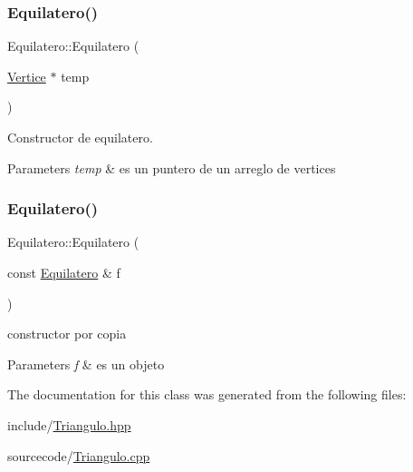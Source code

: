 \subsubsection{\texorpdfstring{Equilatero()}{Equilatero()}\hspace{0.1cm}{\footnotesize\ttfamily [1/2]}}
{\footnotesize\ttfamily Equilatero\+::\+Equilatero (\begin{DoxyParamCaption}\item[{\hyperlink{class_vertice}{Vertice} $\ast$}]{temp }\end{DoxyParamCaption})}



Constructor de equilatero. 


\begin{DoxyParams}{Parameters}
{\em temp} & es un puntero de un arreglo de vertices \\
\hline
\end{DoxyParams}
\mbox{\label{class_equilatero_a57d43b4311c0016b838ad9796e9162b4}} 
\subsubsection{\texorpdfstring{Equilatero()}{Equilatero()}\hspace{0.1cm}{\footnotesize\ttfamily [2/2]}}
{\footnotesize\ttfamily Equilatero\+::\+Equilatero (\begin{DoxyParamCaption}\item[{const \hyperlink{class_equilatero}{Equilatero} \&}]{f }\end{DoxyParamCaption})}



constructor por copia 


\begin{DoxyParams}{Parameters}
{\em f} & es un objeto \\
\hline
\end{DoxyParams}


The documentation for this class was generated from the following files\+:\begin{DoxyCompactItemize}
\item 
include/\hyperlink{_triangulo_8hpp}{Triangulo.\+hpp}\item 
sourcecode/\hyperlink{_triangulo_8cpp}{Triangulo.\+cpp}\end{DoxyCompactItemize}
